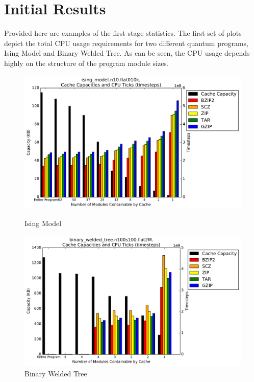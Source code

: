 \section*{Initial Results}
	Provided here are examples of the first stage statistics. The first set of plots depict the total CPU usage requirements for two different quantum programs, Ising Model and Binary Welded Tree. As can be seen, the CPU usage depends highly on the structure of the program module sizes.\par
\begin{figure}[h]
	\begin{minipage}{0.5\textwidth}
		\centering
		\includegraphics[width=\linewidth]{Figures/ising.png}
		\caption{Ising Model}
        \label{fig:ising}
	\end{minipage}\hfill
	\begin{minipage}{0.45\textwidth}
		\centering
        \includegraphics[width=1.1\linewidth]{Figures/bwt.png}
		\caption{Binary Welded Tree}
        \label{fig:bwt}
	\end{minipage}
\end{figure}

